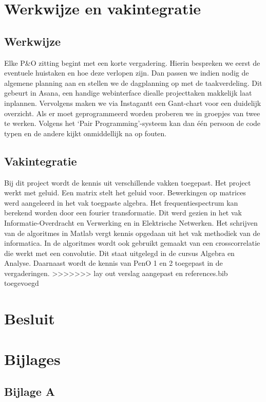 \documentclass[12pt]{report}
\begin{document}
\chapter{Werkwijze en vakintegratie}
\section{Werkwijze}
Elke P\&O zitting begint met een korte vergadering. Hierin bespreken we eerst de eventuele huistaken en hoe deze verlopen zijn. Dan passen we indien nodig de  algemene planning aan en stellen we de dagplanning op met de taakverdeling. Dit gebeurt in Asana, een handige webinterface diealle projecttaken makkelijk laat inplannen. Vervolgens maken we via Instagantt een Gant-chart voor een duidelijk overzicht. 
Als er moet geprogrammeerd worden proberen we in groepjes van twee te werken. Volgens het ‘Pair Programming’-systeem kan dan één persoon de code typen en de andere kijkt onmiddellijk na op fouten. 
\section{Vakintegratie}

Bij dit project wordt de kennis uit verschillende vakken toegepast. Het project werkt met geluid. Een matrix stelt het geluid voor. Bewerkingen op matrices werd aangeleerd in het vak toegpaste algebra. Het frequentiespectrum kan berekend worden door een fourier transformatie. Dit werd gezien in het vak Informatie-Overdracht en Verwerking en in Elektrische Netwerken. Het schrijven van de algoritmes in Matlab vergt kennis opgedaan uit het vak methodiek van de informatica. In de algoritmes wordt ook gebruikt gemaakt van een crosscorrelatie die werkt met een convolutie. Dit staat uitgelegd in de cursus Algebra en Analyse. Daarnaast wordt de kennis van PenO 1 en 2 toegepast in de vergaderingen. 
>>>>>>> lay out verslag aangepast en references.bib toegevoegd

\chapter{Besluit}







\chapter{Bijlages}
\section{Bijlage A}
\label{sec:bijlageA}
\end{document}
